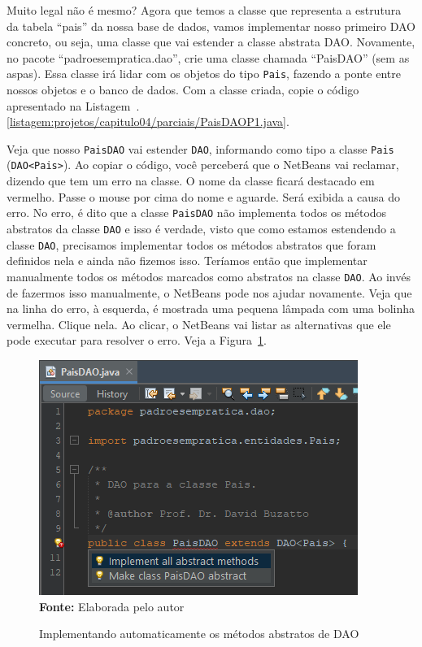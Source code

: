 
Muito legal não é mesmo? Agora que temos a classe que representa a estrutura da tabela ``pais'' da nossa base de dados, vamos implementar nosso primeiro DAO concreto, ou seja, uma classe que vai estender a classe abstrata DAO. Novamente, no pacote ``padroesempratica.dao'', crie uma classe chamada ``PaisDAO'' (sem as aspas). Essa classe irá lidar com os objetos do tipo \texttt{Pais}, fazendo a ponte entre nossos objetos e o banco de dados. Com a classe criada, copie o código apresentado na Listagem~\thechapter.\ref{listagem:projetos/capitulo04/parciais/PaisDAOP1.java}.


Veja que nosso \texttt{PaisDAO} vai estender \texttt{DAO}, informando como tipo a classe \texttt{Pais} (\texttt{DAO<Pais>}). Ao copiar o código, você perceberá que o NetBeans vai reclamar, dizendo que tem um erro na classe. O nome da classe ficará destacado em vermelho. Passe o mouse por cima do nome e aguarde. Será exibida a causa do erro. No erro, é dito que a classe \texttt{PaisDAO} não implementa todos os métodos abstratos da classe \texttt{DAO} e isso é verdade, visto que como estamos estendendo a classe \texttt{DAO}, precisamos implementar todos os métodos abstratos que foram definidos nela e ainda não fizemos isso. Teríamos então que implementar manualmente todos os métodos marcados como abstratos na classe \texttt{DAO}. Ao invés de fazermos isso manualmente, o NetBeans pode nos ajudar novamente. Veja que na linha do erro, à esquerda, é mostrada uma pequena lâmpada com uma bolinha vermelha. Clique nela. Ao clicar, o NetBeans vai listar as alternativas que ele pode executar para resolver o erro. Veja a Figura~\ref{fig:cap04ImplementacaoAutomatica}.

\FloatBarrier
\begin{figure}[!htbp]
    \centering
    \caption{Implementando automaticamente os métodos abstratos de DAO}
    \includegraphics[scale=1]{imagens/cap04ImplementacaoAutomatica}
    \\\textbf{Fonte:} Elaborada pelo autor
    \label{fig:cap04ImplementacaoAutomatica}
\end{figure}
\FloatBarrier

